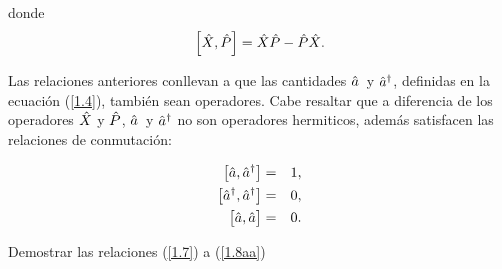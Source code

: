 donde
\begin{equation*}
\left[ \hat{X},\hat{P}\right] =\hat{X} \hat{P}-\hat{P} \hat{X}.
\end{equation*}

\noindent
Las relaciones anteriores conllevan a que las cantidades $\hat{a}$\ y $\hat{a}^{\dagger }$, definidas en la ecuaci\'{o}n (\ref{1.4}), tambi\'{e}n sean operadores. Cabe resaltar que a diferencia de los operadores $\hat{X}$ y $\hat{P}$, $\hat{a}$\ y $\hat{a}^{\dagger }$ no son operadores hermiticos, además satisfacen las relaciones de conmutación:

\begin{eqnarray}
\left[ \Oaa,\Oaa^{\dagger }\right] &=&1, \label{1.7} \\
\left[ \Oaa^{\dagger },\Oaa^{\dagger }\right] &=& 0 , \label{1.8} \\
\comm\big{\Oaa}{\Oaa} &=& 0 . \label{1.8aa}
\end{eqnarray}

\begin{exercise}
 Demostrar las relaciones (\ref{1.7}) a (\ref{1.8aa})
\end{exercise}

